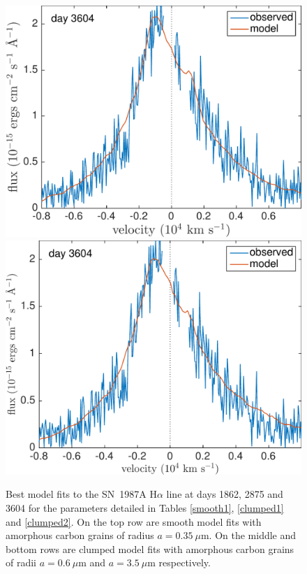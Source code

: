 \begin{figure}
\includegraphics[trim =0 0 0 -20,clip=true,scale=0.4]{chapters/chapter5/images/clump_1/best_fit/d3604Ha.pdf}
\includegraphics[trim =25 0 0 -20,clip=true,scale=0.4]{chapters/chapter5/images/clump_1/maximum/d3604Ha.pdf}
\vspace{8mm}
\caption{Best model fits to the SN~1987A H$\alpha$ line at days 1862, 2875 and 
3604 for the parameters detailed in Tables \ref{smooth1}, \ref{clumped1} and \ref{clumped2}.  On the top row are smooth model fits with amorphous carbon grains of radius $a=0.35~\mu$m.  On the middle and bottom rows are clumped model fits with amorphous carbon grains of radii $a=0.6~\mu$m and $a=3.5~\mu$m respectively.}
\label{d1862_3604}

\end{figure}

